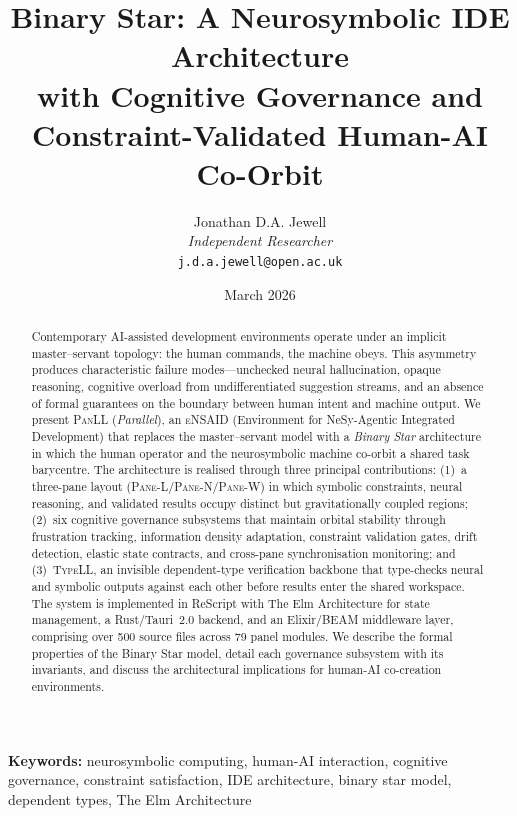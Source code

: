 \documentclass[11pt,a4paper]{article}
\title{Binary Star: A Neurosymbolic IDE Architecture\\with Cognitive Governance and\\Constraint-Validated Human-AI Co-Orbit}
\author{Jonathan D.A. Jewell\\
\textit{Independent Researcher}\\
\texttt{j.d.a.jewell@open.ac.uk}}
\date{March 2026}
\newcommand{\paneL}{\textsc{Pane-L}}
\newcommand{\paneN}{\textsc{Pane-N}}
\newcommand{\paneW}{\textsc{Pane-W}}
\newcommand{\panll}{\textsc{PanLL}}
\newcommand{\typell}{\textsc{TypeLL}}
\newcommand{\ensaid}{\textsc{eNSAID}}
\begin{document}
\maketitle

\begin{abstract}
Contemporary AI-assisted development environments operate under an
implicit master--servant topology: the human commands, the machine
obeys. This asymmetry produces characteristic failure modes---unchecked
neural hallucination, opaque reasoning, cognitive overload from
undifferentiated suggestion streams, and an absence of formal
guarantees on the boundary between human intent and machine output.
We present \panll{} (\textit{Parallel}), an \ensaid{} (Environment
for NeSy-Agentic Integrated Development) that replaces the
master--servant model with a \textit{Binary Star} architecture in
which the human operator and the neurosymbolic machine co-orbit a
shared task barycentre. The architecture is realised through three
principal contributions: (1)~a three-pane layout (\paneL{}/\paneN{}/\paneW{})
in which symbolic constraints, neural reasoning, and validated results
occupy distinct but gravitationally coupled regions; (2)~six cognitive
governance subsystems that maintain orbital stability through
frustration tracking, information density adaptation, constraint
validation gates, drift detection, elastic state contracts, and
cross-pane synchronisation monitoring; and (3)~\typell{}, an invisible
dependent-type verification backbone that type-checks neural and
symbolic outputs against each other before results enter the shared
workspace. The system is implemented in ReScript with The Elm
Architecture for state management, a Rust/Tauri~2.0 backend, and an
Elixir/BEAM middleware layer, comprising over 500 source files across
79 panel modules. We describe the formal properties of the Binary Star
model, detail each governance subsystem with its invariants, and
discuss the architectural implications for human-AI co-creation
environments.
\end{abstract}

\vspace{0.5em}
\noindent\textbf{Keywords:} neurosymbolic computing, human-AI interaction,
cognitive governance, constraint satisfaction, IDE architecture,
binary star model, dependent types, The Elm Architecture

\end{document}
